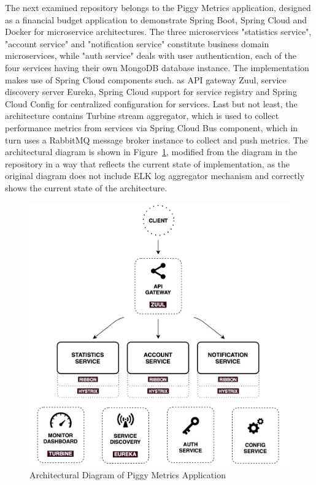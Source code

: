 \documentclass{Configuration_Files/PoliMi3i_thesis}
\begin{document}
The next examined repository belongs to the Piggy Metrics application, designed as a financial budget application to demonstrate Spring Boot, Spring Cloud and Docker for microservice architectures.
The three microservices "statistics service", "account service" and "notification service" constitute business domain microservices, while "auth service" deals with user authentication, each of the four services having their own MongoDB database instance.
The implementation makes use of Spring Cloud components such. as API gateway Zuul, service discovery server Eureka, Spring Cloud support for service registry and Spring Cloud Config for centralized configuration for services.
Last but not least, the architecture contains Turbine stream aggregator, which is used to collect performance metrics from services via Spring Cloud Bus component, which in turn uses a RabbitMQ message broker instance to collect and push metrics.
The architectural diagram is shown in Figure~\ref{fig:R3_arch}, modified from the diagram in the repository in a way that reflects the current state of implementation, as the original diagram does not include ELK log aggregator mechanism and correctly shows the current state of the architecture.

\begin{figure}[H]
\centering
\includegraphics[width=1\textwidth]{myImages/R3.png}
\caption{Architectural Diagram of Piggy Metrics Application}
\label{fig:R3_arch}
\end{figure}
\end{document}
